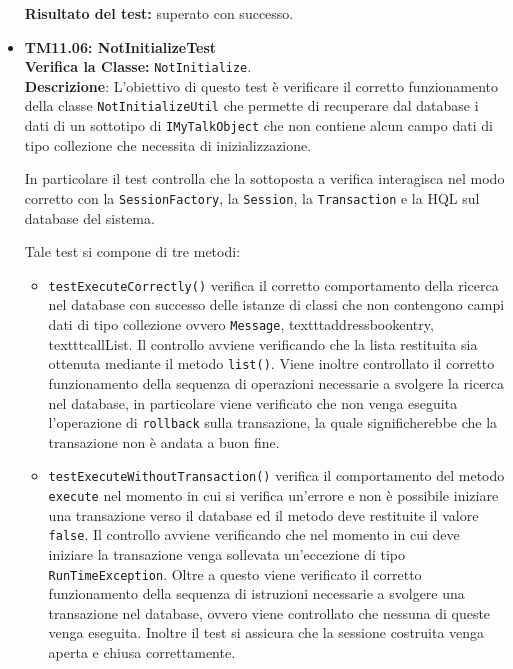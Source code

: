 \begin{itemize}
\begin{itemize}
\end{itemize}
\textbf{Risultato del test:} superato con successo.

\item \textbf{TM11.06: NotInitializeTest}\\
\textbf{Verifica la Classe:} \texttt{NotInitialize}.\\
\textbf{Descrizione}: L'obiettivo di questo test è verificare il corretto funzionamento della classe \texttt{NotInitializeUtil} che permette di recuperare dal database i dati di un sottotipo di \texttt{IMyTalkObject} che non contiene alcun campo dati di tipo collezione che necessita di inizializzazione.

In particolare il test controlla che la  sottoposta a verifica interagisca nel modo corretto con la \texttt{SessionFactory}, la \texttt{Session}, la \texttt{Transaction} e la  HQL sul database del sistema.

Tale test si compone di tre metodi:
\begin{itemize}
\item \texttt{testExecuteCorrectly()} verifica il corretto comportamento della ricerca nel database con successo delle istanze di classi che non contengono campi dati di tipo collezione ovvero \texttt{Message}, texttt{addressbookentry}, texttt{callList}.  
Il controllo avviene verificando che la lista restituita sia ottenuta mediante il metodo \texttt{list()}. 
Viene inoltre controllato il corretto funzionamento della sequenza di operazioni necessarie a svolgere la ricerca nel database, in particolare viene verificato che non venga eseguita l'operazione di \texttt{rollback} sulla transazione, la quale significherebbe che la transazione non è andata a buon fine.

\item \texttt{testExecuteWithoutTransaction()} verifica il comportamento del metodo \\ \texttt{execute} nel momento in cui si verifica un'errore e non è possibile iniziare una transazione verso il database ed il metodo deve restituite il valore \texttt{false}. Il controllo avviene verificando che nel momento in cui deve iniziare la transazione venga sollevata un'eccezione di tipo \texttt{RunTimeException}. Oltre a questo viene verificato il corretto funzionamento della sequenza di istruzioni necessarie a svolgere una transazione nel database, ovvero viene controllato che nessuna di queste venga eseguita. Inoltre il test si assicura che la sessione costruita venga aperta e chiusa correttamente.


\end{itemize}
\end{itemize}

